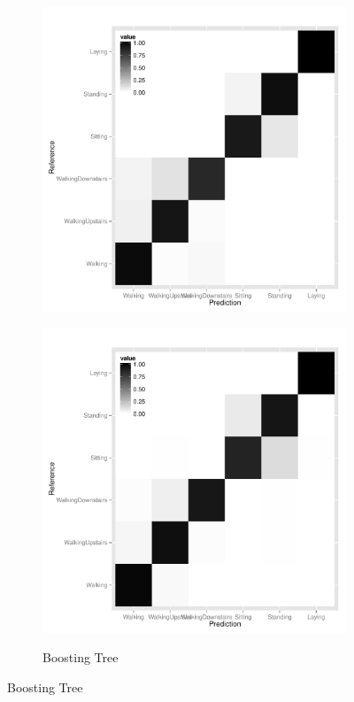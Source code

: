 \begin{appendices}
\begin{figure}[!htb]
\begin{subfigure}[b]{0.49\textwidth}
    \includegraphics[width=\textwidth]{heatmap_rf.pdf}
    \label{fig:heatmap_rf}
  \end{subfigure}
  \hfill
  \begin{subfigure}[b]{0.49\textwidth}
    \caption{Boosting Tree}
    \includegraphics[width=\textwidth]{heatmap_boost.pdf}
    \label{fig:heatmap_boost}
  \end{subfigure}
\end{figure}


\end{appendices}
